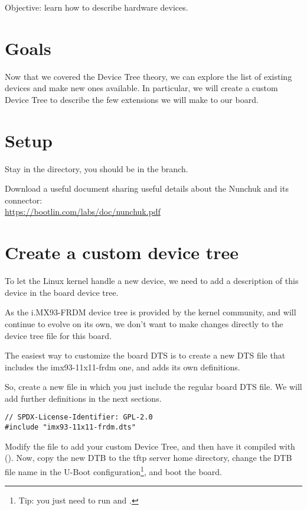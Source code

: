 {Objective: learn how to describe hardware devices.}

\section{Goals}

Now that we covered the Device Tree theory, we can explore the list of
existing devices and make new ones available. In particular, we will
create a custom Device Tree to describe the few extensions we will make
to our board.

\section{Setup}

Stay in the  directory, you should be in
the  branch.

Download a useful document sharing useful details about the Nunchuk
and its connector:\\
\url{https://bootlin.com/labs/doc/nunchuk.pdf}

\section{Create a custom device tree}

To let the Linux kernel handle a new device, we need to add a
description of this device in the board device tree.

As the i.MX93-FRDM device tree is provided by the kernel community,
and will continue to evolve on its own, we don't want to make changes
directly to the device tree file for this board.

The easiest way to customize the board DTS is to create a new DTS file
that includes the imx93-11x11-frdm one, and adds
its own definitions.

So, create a new
 file in which
you just include the regular board DTS file. We will add further
definitions in the next sections.

\begin{verbatim}
// SPDX-License-Identifier: GPL-2.0
#include "imx93-11x11-frdm.dts"
\end{verbatim}
Modify the  file to add your custom
Device Tree, and then have it compiled with (). Now,
copy the new DTB to the tftp server home directory, change the DTB file
name in the U-Boot configuration\footnote{Tip: you just need to run
 and .}, and boot the board.


